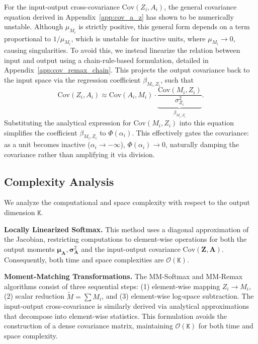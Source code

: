 \documentclass{uai2026} %
\begin{document}
For the input-output cross-covariance $\text{Cov}(Z_i, A_i)$, the general covariance equation derived in Appendix~\ref{app:cov_a_z} has shown to be numerically unstable. Although $\mu_{M_i}$ is strictly positive, this general form depends on a term proportional to $1/\mu_{M_i}$, which is unstable for inactive units, where $\mu_{M_i} \to 0$, causing singularities. To avoid this, we instead linearize the relation between input and output using a chain-rule-based formulation, detailed in Appendix~\ref{app:cov_remax_chain}. This projects the output covariance back to the input space via the regression coefficient $\beta_{M_i, Z_i}$, such that
\begin{equation*}
\text{Cov}(Z_i, A_i) \approx \text{Cov}(A_i, M_i) \cdot \underbrace{\frac{\text{Cov}(M_i, Z_i)}{\sigma_{Z_i}^2}}_{\beta_{M_i, Z_i}}.
\end{equation*}
Substituting the analytical expression for $\text{Cov}(M_i, Z_i)$ into this equation simplifies the coefficient $\beta_{M_i, Z_i}$ to $\Phi(\alpha_i)$. This effectively gates the covariance: as a unit becomes inactive ($\alpha_i \to -\infty$), $\Phi(\alpha_i) \to 0$, naturally damping the covariance rather than amplifying it via division.

\subsection{Complexity Analysis}

We analyze the computational and space complexity with respect to the output dimension $\mathtt{K}$.

\textbf{Locally Linearized Softmax.} This method uses a diagonal approximation of the Jacobian, restricting computations to element-wise operations for both the output moments $\bm{\mu}_{\bm{A}}, \bm{\sigma}_{\bm{A}}^2$ and the input-output covariance $\text{Cov}(\bm{Z}, \bm{A})$. Consequently, both time and space complexities are $\mathcal{O}(\mathtt{K})$.

\textbf{Moment-Matching Transformations.} The MM-Softmax and MM-Remax algorithms consist of three sequential steps: (1) element-wise mapping $Z_i \to M_i$, (2) scalar reduction $\tilde{M} = \sum M_i$, and (3) element-wise log-space subtraction. The input-output cross-covariance is similarly derived via analytical approximations that decompose into element-wise statistics. This formulation avoids the construction of a dense covariance matrix, maintaining $\mathcal{O}(\mathtt{K})$ for both time and space complexity.
\end{document}
